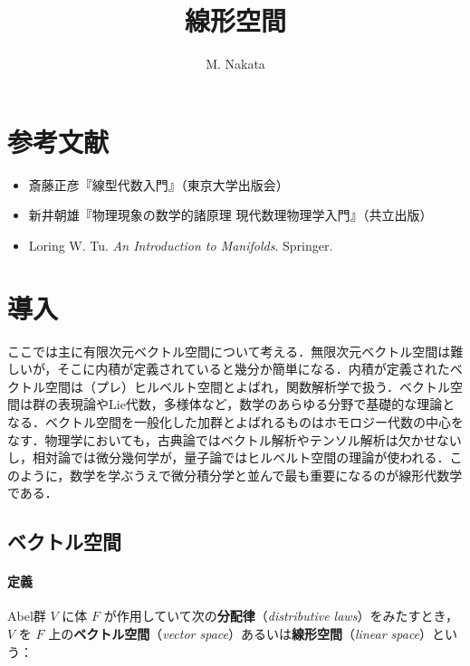 \documentclass[b5paper,pandoc]{bxjsarticle}
\title{線形空間}
\author{M. Nakata}
\date{}
\providecommand{\tightlist}{%
  \setlength{\itemsep}{0pt}\setlength{\parskip}{0pt}}
\let\oldparagraph\paragraph
\renewcommand{\paragraph}[1]{\oldparagraph{#1}\mbox{}}
\begin{document}
\maketitle

{
\setcounter{tocdepth}{3}
\tableofcontents
}
\hypertarget{ux53c2ux8003ux6587ux732e}{%
\section{参考文献}\label{ux53c2ux8003ux6587ux732e}}

\begin{itemize}
\tightlist
\item
  斎藤正彦『線型代数入門』（東京大学出版会）
\item
  新井朝雄『物理現象の数学的諸原理 現代数理物理学入門』（共立出版）
\item
  Loring W. Tu. \emph{An Introduction to Manifolds}. Springer.
\end{itemize}

\hypertarget{linear-algebra-introduction}{%
\section{導入}\label{linear-algebra-introduction}}

ここでは主に有限次元ベクトル空間について考える．無限次元ベクトル空間は難しいが，そこに内積が定義されていると幾分か簡単になる．内積が定義されたベクトル空間は（プレ）ヒルベルト空間とよばれ，関数解析学で扱う．ベクトル空間は群の表現論やLie代数，多様体など，数学のあらゆる分野で基礎的な理論となる．ベクトル空間を一般化した加群とよばれるものはホモロジー代数の中心をなす．物理学においても，古典論ではベクトル解析やテンソル解析は欠かせないし，相対論では微分幾何学が，量子論ではヒルベルト空間の理論が使われる．このように，数学を学ぶうえで微分積分学と並んで最も重要になるのが線形代数学である．

\hypertarget{vector-spaces}{%
\subsection{ベクトル空間}\label{vector-spaces}}

\hypertarget{vector-space-def}{%
\paragraph{定義}\label{vector-space-def}}

Abel群 \(V\) に体 \(F\)
が作用していて次の\textbf{分配律}（\emph{distributive
laws}）をみたすとき，\(V\) を \(F\)
上の\textbf{ベクトル空間}（\emph{vector
space}）あるいは\textbf{線形空間}（\emph{linear space}）という：
\end{document}
